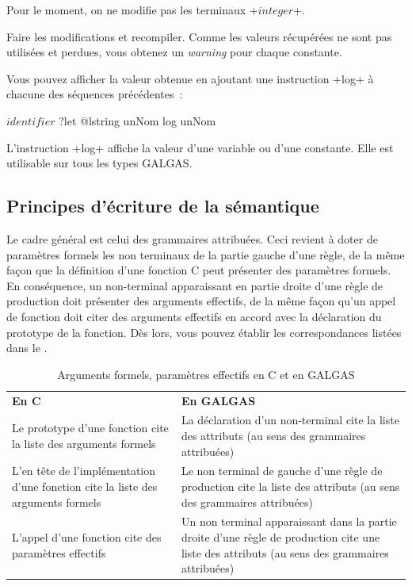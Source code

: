 Pour le moment, on ne modifie pas les terminaux \ggsq+$integer$+.

Faire les modifications et recompiler. Comme les valeurs récupérées ne sont pas utilisées et perdues, vous obtenez un \emph{warning} pour chaque constante.

Vous pouvez afficher la valeur obtenue en ajoutant une instruction \ggsq+log+ à chacune des séquences précédentes~:
\begin{galgas4}
$identifier$ ?let @lstring unNom
log unNom
\end{galgas4}

L'instruction \ggsq+log+ affiche la valeur d'une variable ou d’une constante. Elle est utilisable sur tous les types GALGAS.

\subsection{Principes d'écriture de la sémantique}

Le cadre général est celui des grammaires attribuées. Ceci revient à doter de paramètres formels les non terminaux de la partie gauche d'une règle, de la même façon que la définition d'une fonction C peut présenter des paramètres formels. En conséquence, un non-terminal apparaissant en partie droite d'une règle de production doit présenter des arguments effectifs, de la même façon qu'un appel de fonction doit citer des arguments effectifs en accord avec la déclaration du prototype de la fonction. Dès lors, vous pouvez établir les correspondances listées dans le .

\begin{table}[t]
  \centering
  \begin{tabular}{p{8cm}p{6.7cm}}
    \textbf{En C} & \textbf{En GALGAS} \\
     Le prototype d'une fonction cite la liste des arguments formels & La déclaration d'un non-terminal cite la liste des attributs (au sens des grammaires attribuées) \\
     L'en tête de l'implémentation d'une fonction cite la liste des arguments formels & Le non terminal de gauche d'une règle de production cite la liste des attributs (au sens des grammaires attribuées) \\
     L'appel d'une fonction cite des paramètres effectifs & Un non terminal apparaissant dans la partie droite d'une règle de production cite une liste des attributs (au sens des grammaires attribuées) \\
  \end{tabular}
  \caption{Arguments formels, paramètres effectifs en C et en GALGAS}
\end{table}

